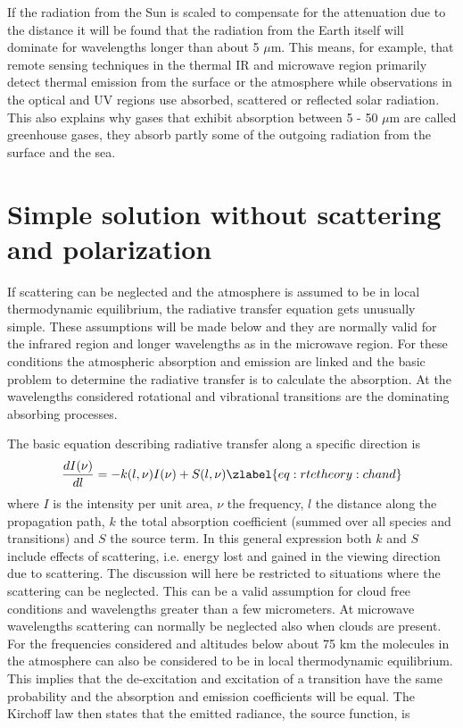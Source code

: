 If the radiation from the Sun is scaled to compensate for the
 attenuation due to the distance it will be found that the radiation
 from the Earth itself will dominate for wavelengths longer than about
 5 $\mu$m. This means, for example, that remote sensing techniques in
 the thermal IR and microwave region primarily detect thermal emission
 from the surface or the atmosphere while observations in the optical
 and UV regions use absorbed, scattered or reflected solar radiation.
 This also explains why gases that exhibit absorption between 5 - 50
 $\mu$m are called greenhouse gases, they absorb partly some of the
 outgoing radiation from the surface and the sea.

\section{Simple solution without scattering and polarization}

 If scattering can be neglected and the atmosphere is assumed to be in
 local thermodynamic equilibrium, the radiative transfer equation gets
 unusually simple. These assumptions will be made below and
 they are normally valid for the infrared region and longer
 wavelengths as in the microwave region. For these conditions the
 atmospheric absorption and emission are linked and the basic problem
 to determine the radiative transfer is to calculate the absorption.
 At the wavelengths considered rotational and vibrational transitions
 are the dominating absorbing processes.

 The basic equation describing radiative transfer along a specific 
 direction is
 \begin{equation}
   \frac{dI(\nu)}{dl} = -k(l,\nu)I(\nu) + S(l,\nu)
  \zlabel{eq:rtetheory:chand}
 \end{equation} 
 where $I$ is the intensity per unit area, $\nu$ the frequency, $l$
 the distance along the propagation path, $k$ the total absorption
 coefficient (summed over all species and transitions) and $S$ the
 source term. In this general expression both $k$ and $S$ include
 effects of scattering, i.e. energy lost and gained in the viewing
 direction due to scattering. The discussion will here be restricted
 to situations where the scattering can be neglected. This can be a
 valid assumption for cloud free conditions and wavelengths greater
 than a few micrometers. At microwave wavelengths scattering can
 normally be neglected also when clouds are present. For the
 frequencies considered and altitudes below about 75 km the molecules
 in the atmosphere can also be considered to be in local thermodynamic
 equilibrium. This implies that the de-excitation and excitation of a
 transition have the same probability and the absorption and emission
 coefficients will be equal.  The Kirchoff law then states that the
 emitted radiance, the source function, is

